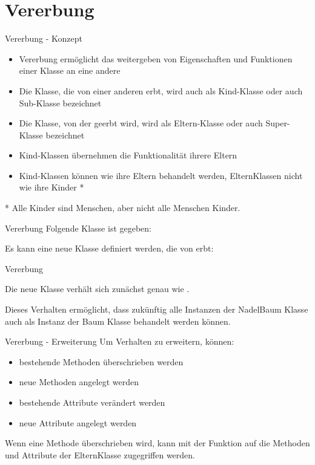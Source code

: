 \section{Vererbung}
\begin{frame}{Vererbung - Konzept}
	\begin{itemize}
		\item Vererbung ermöglicht das weitergeben von Eigenschaften und Funktionen einer Klasse an eine andere
		\item Die Klasse, die von einer anderen erbt, wird auch als \alert{Kind-Klasse} oder auch \alert{Sub-Klasse} bezeichnet
		\item Die Klasse, von der geerbt wird, wird als \alert{Eltern-Klasse} oder auch \alert{Super-Klasse} bezeichnet
		\item Kind-Klassen übernehmen die Funktionalität ihrere Eltern
		\item Kind-Klassen können wie ihre Eltern behandelt werden, ElternKlassen nicht wie ihre Kinder *
	\end{itemize}
	* Alle Kinder sind Menschen, aber nicht alle Menschen Kinder.
\end{frame}

\begin{frame}{Vererbung}
	Folgende Klasse ist gegeben:
	
	Es kann eine neue Klasse definiert werden, die von  erbt:
	
\end{frame}

\begin{frame}{Vererbung}
	
	Die neue Klasse  verhält sich zunächst genau wie .
	
	Dieses Verhalten ermöglicht, dass zukünftig alle Instanzen der NadelBaum Klasse auch als Instanz der Baum Klasse behandelt werden können.
\end{frame}

\begin{frame}{Vererbung - Erweiterung}
	Um Verhalten zu erweitern, können:
	\begin{itemize}
		\item bestehende Methoden überschrieben werden
		\item neue Methoden angelegt werden
		\item bestehende Attribute verändert werden
		\item neue Attribute angelegt werden
	\end{itemize}
	Wenn eine Methode überschrieben wird, kann mit der  Funktion
	auf die Methoden und Attribute der ElternKlasse zugegriffen werden.
	
\end{frame}


